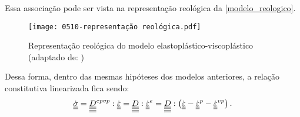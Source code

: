 Essa associação pode ser vista na representação reológica da \autoref{modelo_reologico}.
\begin{figure}[H]
	\begin{center}
		\texttt{[image: 0510-representação reológica.pdf]}
	\end{center}
	\caption{\label{modelo_reologico}Representação reológica do modelo elastoplástico-viscoplástico (adaptado de: )}
\end{figure}
Dessa forma, dentro das mesmas hipóteses dos modelos anteriores, a relação constitutiva linearizada fica sendo:
\begin{equation}
	\label{eq:lei_epvp}
	\dot {\underline{\underline \sigma}} = \underline{\underline{\underline{\underline D}}}^{epvp}:\dot {\underline{\underline \varepsilon}} = \underline{\underline{\underline{\underline D}}}:\dot {\underline{\underline \varepsilon}}^e = \underline{\underline{\underline{\underline D}}}:\left(\dot {\underline{\underline \varepsilon}} - \dot {\underline{\underline \varepsilon}}^{p} - \dot {\underline{\underline \varepsilon}}^{vp} \right).
\end{equation}

